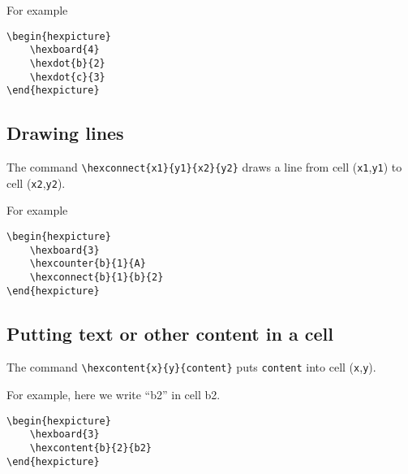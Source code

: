 \documentclass[a4paper,12pt]{article}
\begin{document}
    For example
    
    \begin{verbatim}\begin{hexpicture}
    \hexboard{4}
    \hexdot{b}{2}
    \hexdot{c}{3}
\end{hexpicture}\end{verbatim}
    
    \begin{hexpicture}
    \end{hexpicture}
    
    \subsection{Drawing lines}
    
    The command \verb|\hexconnect{x1}{y1}{x2}{y2}| draws a line from cell (\verb|x1|,\verb|y1|) to cell (\verb|x2|,\verb|y2|).
    
    For example
    
    \begin{verbatim}\begin{hexpicture}
    \hexboard{3}
    \hexcounter{b}{1}{A}
    \hexconnect{b}{1}{b}{2}
\end{hexpicture}\end{verbatim}
    
    \begin{hexpicture}
    \end{hexpicture}

    \subsection{Putting text or other content in a cell}
    
    The command \verb|\hexcontent{x}{y}{content}| puts \verb|content| into cell (\verb|x|,\verb|y|). 
    
    For example, here we write ``b2'' in cell b2.
    
    \begin{verbatim}\begin{hexpicture}
    \hexboard{3}
    \hexcontent{b}{2}{b2}
\end{hexpicture}\end{verbatim}
    
    \begin{hexpicture}
    \end{hexpicture}
\end{document}
